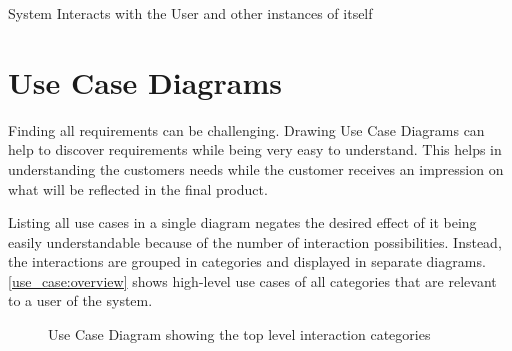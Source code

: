 \begin{figure}[H]
	\centering
	\caption{}
	\label{system_context_diagramm}
\end{figure}


System Interacts with the User and other instances of itself


\section{Use Case Diagrams}

Finding all requirements can be challenging.
Drawing Use Case Diagrams can help to discover requirements while being very easy to understand.
This helps in understanding the customers needs \cite{Rosenberg2007} while the customer receives an impression on what will be reflected in the final product.

Listing all use cases in a single diagram negates the desired effect of it being easily understandable because of the number of interaction possibilities.
Instead, the interactions are grouped in categories and displayed in separate diagrams.
\autoref{use_case:overview} shows high-level use cases of all categories that are relevant to a user of the system.

\begin{figure}[H]
	\centering
	\caption{Use Case Diagram showing the top level interaction categories}
	\label{use_case:overview}
\end{figure}

